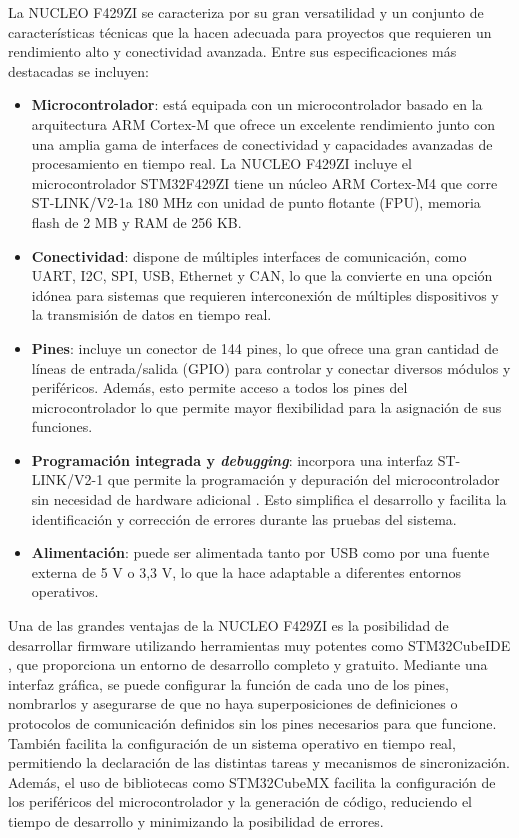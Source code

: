 La NUCLEO F429ZI se caracteriza por su gran versatilidad y un conjunto de características técnicas que la hacen adecuada para proyectos que requieren un rendimiento alto y conectividad avanzada. Entre sus especificaciones más destacadas se incluyen:

\begin{itemize}
    \item \textbf{Microcontrolador}: está equipada con un microcontrolador basado en la arquitectura ARM Cortex-M que ofrece un excelente rendimiento junto con una amplia gama de interfaces de conectividad y capacidades avanzadas de procesamiento en tiempo real. La NUCLEO F429ZI incluye el microcontrolador STM32F429ZI \cite{stm32f429zi} tiene un núcleo ARM Cortex-M4 que corre ST-LINK/V2-1a 180 MHz con unidad de punto flotante (FPU), memoria flash de 2 MB y RAM de 256 KB. 

    \item \textbf{Conectividad}: dispone de múltiples interfaces de comunicación, como UART, I2C, SPI, USB, Ethernet y CAN, lo que la convierte en una opción idónea para sistemas que requieren interconexión de múltiples dispositivos y la transmisión de datos en tiempo real.

    \item \textbf{Pines}: incluye un conector de 144 pines, lo que ofrece una gran cantidad de líneas de entrada/salida (GPIO) para controlar y conectar diversos módulos y periféricos. Además, esto permite acceso a todos los pines del microcontrolador lo que permite mayor flexibilidad para la asignación de sus funciones.

    \item \textbf{Programación integrada y \textit{debugging}}: incorpora una interfaz ST-LINK/V2-1 que permite la programación y depuración del microcontrolador sin necesidad de hardware adicional \cite{st_link}. Esto simplifica el desarrollo y facilita la identificación y corrección de errores durante las pruebas del sistema.

    \item \textbf{Alimentación}: puede ser alimentada tanto por USB como por una fuente externa de 5 V o 3,3 V, lo que la hace adaptable a diferentes entornos operativos.
\end{itemize}

Una de las grandes ventajas de la NUCLEO F429ZI es la posibilidad de desarrollar firmware utilizando herramientas muy potentes como STM32CubeIDE \cite{stCubeIde}, que proporciona un entorno de desarrollo completo y gratuito. Mediante una interfaz gráfica, se puede configurar la función de cada uno de los pines, nombrarlos y asegurarse de que no haya superposiciones de definiciones o protocolos de comunicación definidos sin los pines necesarios para que funcione. También facilita la configuración de un sistema operativo en tiempo real, permitiendo la declaración de las distintas tareas y mecanismos de sincronización. Además, el uso de bibliotecas como STM32CubeMX \cite{stCubeMx} facilita la configuración de los periféricos del microcontrolador y la generación de código, reduciendo el tiempo de desarrollo y minimizando la posibilidad de errores. 


